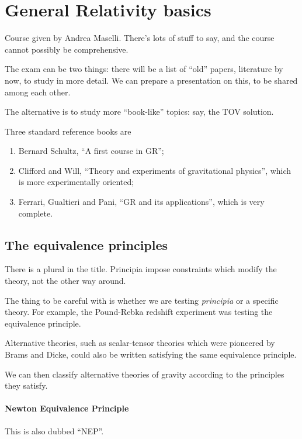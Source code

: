 \documentclass[main.tex]{subfiles}
\begin{document}
\section{General Relativity basics}


Course given by Andrea Maselli.
There's lots of stuff to say, and the course cannot possibly be comprehensive. 

The exam can be two things: there will be a list of ``old'' papers, literature by now, to study in more detail. 
We can prepare a presentation on this, to be shared among each other. 

The alternative is to study more ``book-like'' topics: say, the TOV solution. 

Three standard reference books are 
\begin{enumerate}
    \item Bernard Schultz, ``A first course in GR'';
    \item Clifford and Will, ``Theory and experiments of gravitational physics'', which is more experimentally oriented;
    \item Ferrari, Gualtieri and Pani, ``GR and its applications'', which is very complete. 
\end{enumerate}

\subsection{The equivalence principles}

There is a plural in the title. 
Principia impose constraints which modify the theory, not the other way around. 

The thing to be careful with is whether we are testing \emph{principia} or a specific theory. 
For example, the Pound-Rebka redshift experiment was testing the equivalence principle. 

Alternative theories, such as scalar-tensor theories which were pioneered by Brams and Dicke, could also be written satisfying the same equivalence principle. 

We can then classify alternative theories of gravity according to the principles they satisfy. 

\paragraph{Newton Equivalence Principle} This is also dubbed ``NEP''. 
\end{document}
